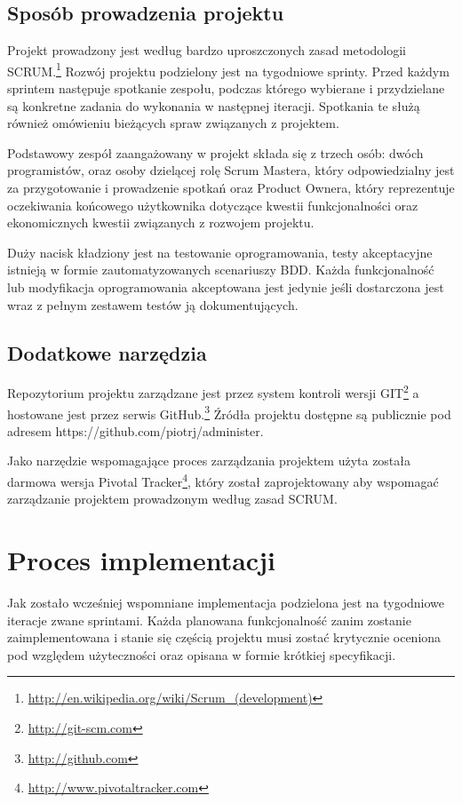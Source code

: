   \subsection{Sposób prowadzenia projektu}
  Projekt prowadzony jest według bardzo uproszczonych zasad metodologii SCRUM.\footnote{\url{http://en.wikipedia.org/wiki/Scrum_(development)}} \nocite{wiki_scrum} Rozwój projektu podzielony jest na tygodniowe sprinty. Przed każdym sprintem następuje spotkanie zespołu, podczas którego wybierane i przydzielane są konkretne zadania do wykonania w następnej iteracji. Spotkania te służą również omówieniu bieżących spraw związanych z projektem.
  
  Podstawowy zespół zaangażowany w projekt składa się z trzech osób: dwóch programistów, oraz osoby dzielącej rolę Scrum Mastera, który odpowiedzialny jest za przygotowanie i prowadzenie spotkań oraz Product Ownera, który reprezentuje oczekiwania końcowego użytkownika dotyczące kwestii funkcjonalności oraz ekonomicznych kwestii związanych z rozwojem projektu.
  
  Duży nacisk kładziony jest na testowanie oprogramowania, testy akceptacyjne istnieją w formie zautomatyzowanych scenariuszy BDD. Każda funkcjonalność lub modyfikacja oprogramowania akceptowana jest jedynie jeśli dostarczona jest wraz z pełnym zestawem testów ją dokumentujących.
  
  \subsection{Dodatkowe narzędzia}
  Repozytorium projektu zarządzane jest przez system kontroli wersji GIT\footnote{\url{http://git-scm.com}} a hostowane jest przez serwis GitHub.\footnote{\url{http://github.com}} Źródła projektu dostępne są publicznie pod adresem https://github.com/piotrj/administer.
  
  Jako narzędzie wspomagające proces zarządzania projektem użyta została darmowa wersja Pivotal Tracker\footnote{\url{http://www.pivotaltracker.com}}, który został zaprojektowany aby wspomagać zarządzanie projektem prowadzonym według zasad SCRUM.
  
  \section{Proces implementacji}
  
  Jak zostało wcześniej wspomniane implementacja podzielona jest na tygodniowe iteracje zwane sprintami. Każda planowana funkcjonalność zanim zostanie zaimplementowana i stanie się częścią projektu musi zostać krytycznie oceniona pod względem użyteczności oraz opisana w formie krótkiej specyfikacji.
  
